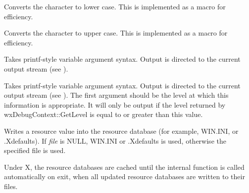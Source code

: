 \label{wxtolower}


Converts the character to lower case. This is implemented as a macro for efficiency.

\label{wxtoupper}


Converts the character to upper case. This is implemented as a macro for efficiency.

\label{wxtrace}


Takes printf-style variable argument syntax. Output
is directed to the current output stream (see ).

\label{wxtracelevel}


Takes printf-style variable argument syntax. Output
is directed to the current output stream (see ).
The first argument should be the level at which this information is appropriate.
It will only be output if the level returned by wxDebugContext::GetLevel is equal to or greater than
this value.

\label{wxwriteresource}





Writes a resource value into the resource database (for example, WIN.INI, or
.Xdefaults). If {\it file} is NULL, WIN.INI or .Xdefaults is used,
otherwise the specified file is used.

Under X, the resource databases are cached until the internal function
 is called automatically on exit, when
all updated resource databases are written to their files.

